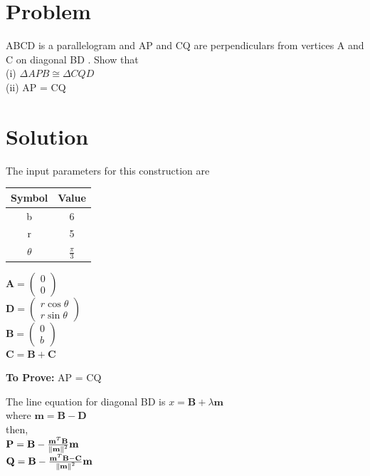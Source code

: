 \documentclass[10pt, a4paper]{article}
\title{\mytitle}
\author{\myauthor\hspace{1em}\\\contact\\FWC22012\hspace{6.5em}IITH\hspace{0.5em}\mymodule\hspace{6em}ASSIGN-5}
\date{}
\newcommand{\myvec}[1]{\ensuremath{\begin{pmatrix}#1\end{pmatrix}}}
\let\vec\mathbf
\begin{document}
	\maketitle
	\tableofcontents
   \section{Problem}
  ABCD is a parallelogram and AP and CQ are
perpendiculars from vertices A and C on diagonal
BD . Show that \\
(i) $\Delta APB \cong \Delta CQD$  \\       
(ii) AP = CQ

   \section{Solution}

The input parameters for this construction are 
\begin{center}
\begin{tabular}{|c|c|}
	\hline
	\textbf{Symbol}&\textbf{Value}\\
	\hline
	b&6\\
	\hline
	r&5\\
	\hline
	$\theta$&$\frac{\pi}{3}$\\
	\hline
\end{tabular}
\begin{center}
$\vec{A}=\myvec{0\\0}$\\
$\vec{D}=\myvec{r\cos\theta \\ r\sin\theta}$\\
$\vec{B}=\myvec{0\\b}$\\
$\vec{C} = \vec{B}+\vec{C}$
\end{center}
\end{center}
\textbf{To Prove:} AP = CQ
		\begin{center}
		The line equation for diagonal BD is $x = \vec{B}+\lambda\vec{m}$
		\\
		where $\vec{m} = \vec{B}-\vec{D}$\\
		
		then,\\
		
		$\vec{P} = \vec{B} - \frac{\vec{m}^T \vec{B}}{\norm{\vec{m}}^2}\vec{m}$
	\\
	
	$\vec{Q} = \vec{B} - \frac{\vec{m}^T \vec{B-C}}{\norm{\vec{m}}^2}\vec{m}$\\
	\end{center}
	
\end{document}
